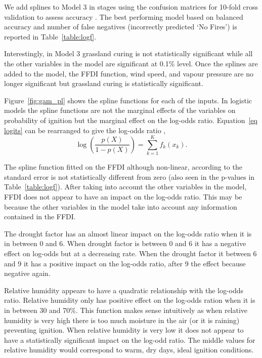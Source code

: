 \documentclass[11pt,a4paper]{article}
\begin{document}
We add splines to Model 3 in stages using the confusion matrices for 10-fold cross validation to assess accuracy \citep[][using the caret package by]{caret}. The best performing model based on balanced accuracy and number of false negatives (incorrectly predicted `No Fires') is reported in Table~\ref{table:logf}.

Interestingly, in Model 3 grassland curing is not statistically significant while all the other variables in the model are significant at 0.1\% level. Once the splines are added to the model, the FFDI function, wind speed, and vapour pressure are no longer significant but grassland curing is statistically significant.

Figure~\ref{fig:gam_pl} shows the spline functions for each of the inputs. In logistic models the spline functions are not the marginal effects of the variables on probability of ignition but the marginal effect on the log-odds ratio. Equation~\eqref{eq logits} can be rearranged to give the log-odds ratio \citep{james13},
\begin{equation}
  \label{eq:logodds}
  \log(\frac{p(X)}{1-p(X)}) = \sum_{k=1}^{K} f_k (x_k).
\end{equation}

The spline function fitted on the FFDI although non-linear, according to the standard error is not statistically different from zero (also seen in the p-values in Table~\ref{table:logf}). After taking into account the other variables in the model, FFDI does not appear to have an impact on the log-odds ratio. This may be because the other variables in the model take into account any information contained in the FFDI.

The drought factor has an almost linear impact on the log-odds ratio when it is in between 0 and 6. When drought factor is between 0 and 6 it has a negative effect on log-odds but at a decreasing rate. When the drought factor it between 6 and 9 it has a positive impact on the log-odds ratio, after 9 the effect because negative again.

Relative humidity appears to have a quadratic relationship with the log-odds ratio. Relative humidity only has positive effect on the log-odds ration when it is in between 30 and 70\%. This function makes sense intuitively as when relative humidity is very high there is too much moisture in the air (or it is raining) preventing ignition. When relative humidity is very low it does not appear to have a statistically significant impact on the log-odd ratio. The middle values for relative humidity would correspond to warm, dry days, ideal ignition conditions.
\end{document}
